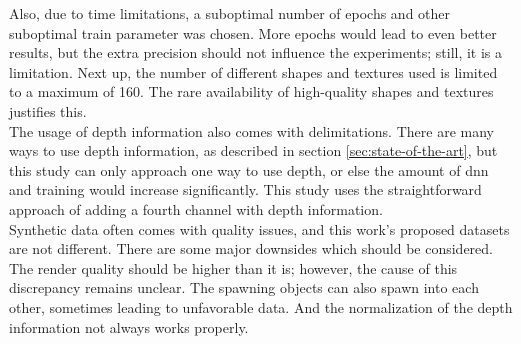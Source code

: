 		Also, due to time limitations, a suboptimal number of epochs and other suboptimal train parameter was chosen. More epochs would lead to even better results, but the extra precision should not influence the experiments; still, it is a limitation.
		Next up, the number of different shapes and textures used is limited to a maximum of 160. The rare availability of high-quality shapes and textures justifies this.\\
		The usage of depth information also comes with delimitations. There are many ways to use depth information, as described in section \ref{sec:state-of-the-art}, but this study can only approach one way to use depth, or else the amount of \ac{dnn} and training would increase significantly. This study uses the straightforward approach of adding a fourth channel with depth information.\\
		Synthetic data often comes with quality issues, and this work's proposed datasets are not different. There are some major downsides which should be considered. The render quality should be higher than it is; however, the cause of this discrepancy remains unclear. The spawning objects can also spawn into each other, sometimes leading to unfavorable data. And the normalization of the depth information not always works properly.
	
	
	
